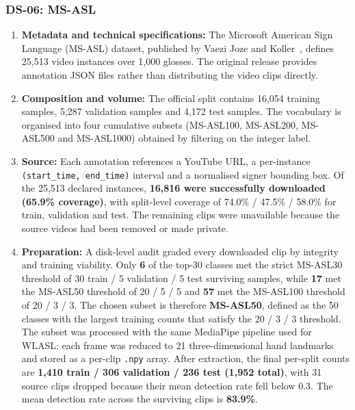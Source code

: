\subsubsection*{DS-06: MS-ASL}

\begin{enumerate}
    \item \textbf{Metadata and technical specifications:} The Microsoft American Sign Language (MS-ASL) dataset, published by Vaezi Joze and
          Koller~\cite{joze2019msasl}, defines 25,513 video instances over 1,000 glosses. The original
          release provides annotation JSON files rather than distributing the video clips directly.

    \item \textbf{Composition and volume:} The official split contains 16,054 training samples, 5,287 validation samples and 4,172 test
          samples. The vocabulary is organised into four cumulative subsets (MS-ASL100, MS-ASL200, MS-ASL500
          and MS-ASL1000) obtained by filtering on the integer label.

    \item \textbf{Source:} Each annotation references a YouTube URL, a per-instance \texttt{(start\_time, end\_time)} interval
          and a normalised signer bounding box. Of the 25,513 declared instances, \textbf{16,816 were
              successfully downloaded (65.9\% coverage)}, with split-level coverage of 74.0\% / 47.5\% / 58.0\%
          for train, validation and test. The remaining clips were unavailable because the source videos had
          been removed or made private.

    \item \textbf{Preparation:} A disk-level audit graded every downloaded clip by integrity and training viability. Only
          \textbf{6} of the top-30 classes met the strict MS-ASL30 threshold of 30 train / 5 validation / 5
          test surviving samples, while \textbf{17} met the MS-ASL50 threshold of 20 / 5 / 5 and \textbf{57}
          met the MS-ASL100 threshold of 20 / 3 / 3. The chosen subset is therefore \textbf{MS-ASL50},
          defined as the 50 classes with the largest training counts that satisfy the 20 / 3 / 3 threshold.
          The subset was processed with the same MediaPipe pipeline used for WLASL: each frame was reduced to
          21 three-dimensional hand landmarks and stored as a per-clip \texttt{.npy} array. After extraction,
          the final per-split counts are \textbf{1,410 train / 306 validation / 236 test (1,952 total)}, with
          31 source clips dropped because their mean detection rate fell below 0.3. The mean detection rate
          across the surviving clips is \textbf{83.9\%}.

\end{enumerate}
